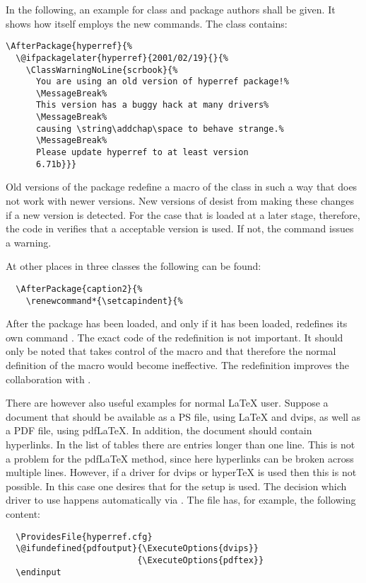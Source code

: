 \begin{Example}
  In the following, an example for class and package authors shall be
  given.  It shows how {\KOMAScript} itself employs the new commands.
  The class  contains:
\begin{lstlisting}
\AfterPackage{hyperref}{%
  \@ifpackagelater{hyperref}{2001/02/19}{}{%
    \ClassWarningNoLine{scrbook}{%
      You are using an old version of hyperref package!%
      \MessageBreak%
      This version has a buggy hack at many drivers%
      \MessageBreak%
      causing \string\addchap\space to behave strange.%
      \MessageBreak%
      Please update hyperref to at least version
      6.71b}}}
\end{lstlisting}
Old versions of the  package redefine a macro of the
 class in such a way that does not work with newer
{\KOMAScript} versions.  New versions of  desist
from making these changes if a new {\KOMAScript} version is detected.
For the case that  is loaded at a later stage,
therefore, the code in  verifies that a acceptable
 version is used.  If not, the command issues a
warning.

At other places in three {\KOMAScript} classes the following can be
found:
\begin{lstlisting}
  \AfterPackage{caption2}{%
    \renewcommand*{\setcapindent}{%
\end{lstlisting}
After the package  has been loaded, and only if it
has been loaded, {\KOMAScript} redefines its own command
.  The exact code of the redefinition is not
important.  It should only be noted that  takes
control of the  macro and that therefore the normal
definition of the  macro would become ineffective.
The redefinition improves the collaboration with .

There are however also useful examples for normal {\LaTeX} user.
Suppose a document that should be available as a PS file, using
{\LaTeX} and dvips, as well as a PDF file, using pdf{\LaTeX}.  In
addition, the document should contain hyperlinks.  In the list of
tables there are entries longer than one line.  This is not a problem
for the pdf{\LaTeX} method, since here hyperlinks can be broken across
multiple lines.  However, if a  driver for dvips or
hyper{\TeX} is used then this is not possible.  In this case one
desires that for the  setup  is
used. The decision which  driver to use happens
automatically via . The file has, for example, the
following content:
\begin{lstlisting}
  \ProvidesFile{hyperref.cfg}
  \@ifundefined{pdfoutput}{\ExecuteOptions{dvips}}
                          {\ExecuteOptions{pdftex}}
  \endinput
\end{lstlisting}


\end{Example}
